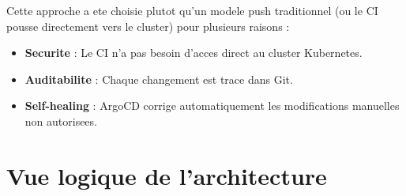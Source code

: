 \documentclass[12pt,a4paper,french]{report}
\begin{document}
Cette approche a ete choisie plutot qu'un modele push traditionnel (ou le CI pousse directement vers le cluster) pour plusieurs raisons :
\begin{itemize}
    \item \textbf{Securite} : Le CI n'a pas besoin d'acces direct au cluster Kubernetes.
    \item \textbf{Auditabilite} : Chaque changement est trace dans Git.
    \item \textbf{Self-healing} : ArgoCD corrige automatiquement les modifications manuelles non autorisees.
\end{itemize}

\section{Vue logique de l'architecture}
\end{document}
